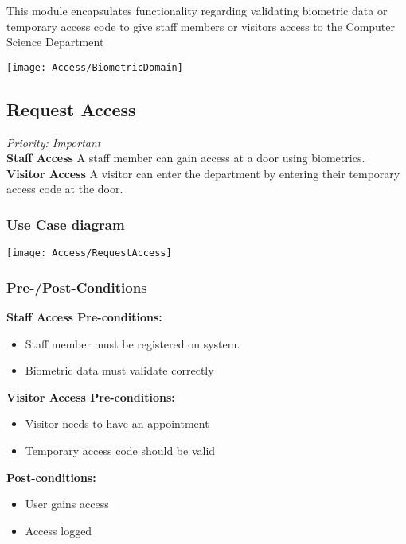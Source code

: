 
This module encapsulates functionality regarding validating biometric data or temporary access code to give staff members or visitors access to the Computer Science Department

\texttt{[image: Access/BiometricDomain]}

\subsection{Request Access}
\textit{Priority: Important} \\


\textbf{Staff Access} A staff member can gain access at a door using biometrics. \\
\textbf{Visitor Access} A visitor can enter the department by entering their temporary access code at the door.

\subsubsection{Use Case diagram}
\texttt{[image: Access/RequestAccess]}

\subsubsection{Pre-/Post-Conditions}
\textbf{Staff Access Pre-conditions:} 
	\begin{itemize}
		\item Staff member must be registered on system.
		\item Biometric data must validate correctly
	\end{itemize}
\textbf{Visitor Access Pre-conditions:} 
	\begin{itemize}
		\item Visitor needs to have an appointment
		\item Temporary access code should be valid
	\end{itemize}
\textbf{ Post-conditions:} 
	\begin{itemize}
		\item User gains access
		\item Access logged
	\end{itemize}